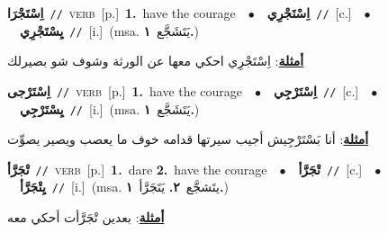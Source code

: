 \documentclass[10pt,a4paper,twoside]{article} %
\begin{document}
\begin{multicols}{2}
{\setlength\topsep{0pt}\textbf{\foreignlanguage{arabic}{اِسْتَجْرَا}}\ {\color{gray}\texttt{//}\color{black}}\ \textsc{verb}\ [p.]\ \textbf{1.}~have the courage\ \ $\bullet$\ \ \setlength\topsep{0pt}\textbf{\foreignlanguage{arabic}{اِسْتَجْرِي}}\ {\color{gray}\texttt{//}\color{black}}\ [c.]\ \ $\bullet$\ \ \setlength\topsep{0pt}\textbf{\foreignlanguage{arabic}{يِسْتَجْرِي}}\ {\color{gray}\texttt{//}\color{black}}\ [i.]\ \color{gray}(msa. \foreignlanguage{arabic}{يَتَشَجَّع}~\foreignlanguage{arabic}{\textbf{١.}})\color{black}\  \begin{flushright}\color{gray}\foreignlanguage{arabic}{\textbf{\underline{\foreignlanguage{arabic}{أمثلة}}}: اِسْتَجْرِي احكي معها عن الورثة وشوف شو بصيرلك}\end{flushright}\color{black}} \vspace{2mm}

{\setlength\topsep{0pt}\textbf{\foreignlanguage{arabic}{اِسْتَرْجى}}\ {\color{gray}\texttt{//}\color{black}}\ \textsc{verb}\ [p.]\ \textbf{1.}~have the courage\ \ $\bullet$\ \ \setlength\topsep{0pt}\textbf{\foreignlanguage{arabic}{اِسْتَرْجِي}}\ {\color{gray}\texttt{//}\color{black}}\ [c.]\ \ $\bullet$\ \ \setlength\topsep{0pt}\textbf{\foreignlanguage{arabic}{يِسْتَرْجِي}}\ {\color{gray}\texttt{//}\color{black}}\ [i.]\ \color{gray}(msa. \foreignlanguage{arabic}{يَتَشَجَّع}~\foreignlanguage{arabic}{\textbf{١.}})\color{black}\  \begin{flushright}\color{gray}\foreignlanguage{arabic}{\textbf{\underline{\foreignlanguage{arabic}{أمثلة}}}: أنا بَسْتَرْجِيش أجيب سيرتها قدامه خوف ما يعصب ويصير يصوِّت}\end{flushright}\color{black}} \vspace{2mm}

{\setlength\topsep{0pt}\textbf{\foreignlanguage{arabic}{تْجَرَّأ}}\ {\color{gray}\texttt{//}\color{black}}\ \textsc{verb}\ [p.]\ \textbf{1.}~dare  \textbf{2.}~have the courage\ \ $\bullet$\ \ \setlength\topsep{0pt}\textbf{\foreignlanguage{arabic}{تْجَرَّأ}}\ {\color{gray}\texttt{//}\color{black}}\ [c.]\ \ $\bullet$\ \ \setlength\topsep{0pt}\textbf{\foreignlanguage{arabic}{يِتْجَرَّأ}}\ {\color{gray}\texttt{//}\color{black}}\ [i.]\ \color{gray}(msa. \foreignlanguage{arabic}{يتَشجَّع}~\foreignlanguage{arabic}{\textbf{٢.}}  \foreignlanguage{arabic}{يَتَجَرَّأ}~\foreignlanguage{arabic}{\textbf{١.}})\color{black}\  \begin{flushright}\color{gray}\foreignlanguage{arabic}{\textbf{\underline{\foreignlanguage{arabic}{أمثلة}}}: بعدين تْجَرَّأت أحكي معه}\end{flushright}\color{black}} \vspace{2mm}


\end{multicols}
\end{document}
